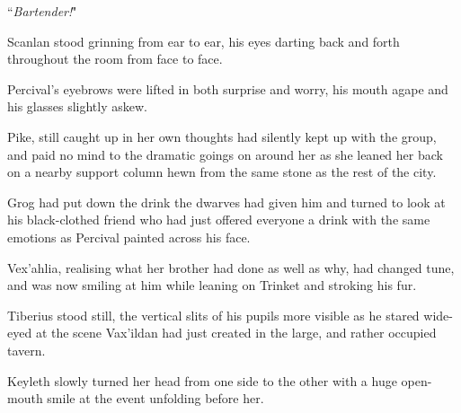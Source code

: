 \begin{center}
    ``\textit{Bartender!}"
\end{center}

Scanlan stood grinning from ear to ear, his eyes darting back and forth throughout the room from face to face.

Percival's eyebrows were lifted in both surprise and worry, his mouth agape and his glasses slightly askew.

Pike, still caught up in her own thoughts had silently kept up with the group, and paid no mind to the dramatic goings on around her as she leaned her back on a nearby support column hewn from the same stone as the rest of the city.

Grog had put down the drink the dwarves had given him and turned to look at his black-clothed friend who had just offered everyone a drink with the same emotions as Percival painted across his face.

Vex'ahlia, realising what her brother had done as well as why, had changed tune, and was now smiling at him while leaning on Trinket and stroking his fur.

Tiberius stood still, the vertical slits of his pupils more visible as he stared wide-eyed at the scene Vax'ildan had just created in the large, and rather occupied tavern.

Keyleth slowly turned her head from one side to the other with a huge open-mouth smile at the event unfolding before her.

\newpage

